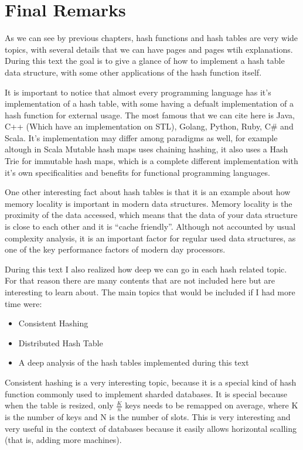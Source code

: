\chapter{Final Remarks}
\label{cap:conclusions}

As we can see by previous chapters, hash functions and hash tables are very wide topics, with several details that we can have pages and pages wtih explanations. During this text the goal is to give a glance of how to implement a hash table data structure, with some other applications of the hash function itself.

It is important to notice that almost every programming language has it's implementation of a hash table, with some having a defualt implementation of a hash function for external usage. The most famous that we can cite here is Java, C++ (Which have an implementation on STL), Golang, Python, Ruby, C\# and Scala. It's implementation may differ among paradigms as well, for example altough in Scala Mutable hash maps uses chaining hashing, it also uses a Hash Trie for immutable hash maps, which is a complete different implementation with it's own specificalities and benefits for functional programming languages. \citep{hashMapAnalysis} 

One other interesting fact about hash tables is that it is an example about how memory locality is important in modern data structures. Memory locality is the proximity of the data accessed, which means that the data of your data structure is close to each other and it is ``cache friendly''. Although not accounted by usual complexity analysis, it is an important factor for regular used data structures, as one of the key performance factors of modern day processors.

During this text I also realized how deep we can go in each hash related topic. For that reason there are many contents that are not included here but are interesting to learn about. The main topics that would be included if I had more time were:

\begin{itemize}
\item Consistent Hashing
\item Distributed Hash Table
\item A deep analysis of the hash tables implemented during this text
\end{itemize}

Consistent hashing is a very interesting topic, because it is a special kind of hash function commonly used to implement sharded databases. It is special because when the table is resized, only \( \frac{K}{n} \) keys needs to be remapped on average, where K is the number of keys and N is the number of slots.\citep{wikiConsistent} This is very interesting and very useful in the context of databases because it easily allows horizontal scalling (that is, adding more machines).

